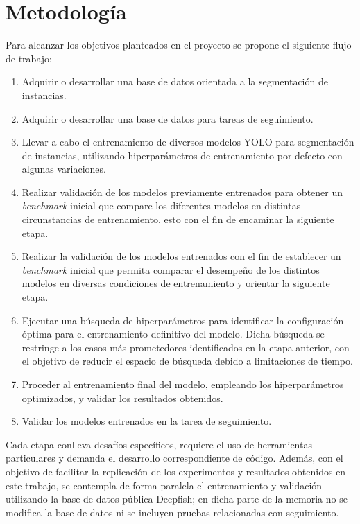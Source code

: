 \section{Metodología}
Para alcanzar los objetivos planteados en el proyecto se propone el siguiente flujo de trabajo:

\begin{enumerate}
    \item Adquirir o desarrollar una base de datos orientada a la segmentación de instancias.
    \item Adquirir o desarrollar una base de datos para tareas de seguimiento.
    \item Llevar a cabo el entrenamiento de diversos modelos YOLO para segmentación de instancias, utilizando hiperparámetros de entrenamiento por defecto con algunas variaciones.
    \item Realizar validación de los modelos previamente entrenados para obtener un \textit{benchmark} inicial que compare los diferentes modelos en distintas circunstancias de entrenamiento, esto con el fin de encaminar la siguiente etapa.
    \item Realizar la validación de los modelos entrenados con el fin de establecer un \textit{benchmark} inicial que permita comparar el desempeño de los distintos modelos en diversas condiciones de entrenamiento y orientar la siguiente etapa.
    \item Ejecutar una búsqueda de hiperparámetros para identificar la configuración óptima para el entrenamiento definitivo del modelo. Dicha búsqueda se restringe a los casos más prometedores identificados en la etapa anterior, con el objetivo de reducir el espacio de búsqueda debido a limitaciones de tiempo.
    \item Proceder al entrenamiento final del modelo, empleando los hiperparámetros optimizados, y validar los resultados obtenidos.
    \item Validar los modelos entrenados en la tarea de seguimiento.
\end{enumerate}

Cada etapa conlleva desafíos específicos, requiere el uso de herramientas particulares y demanda el desarrollo correspondiente de código. Además, con el objetivo de facilitar la replicación de los experimentos y resultados obtenidos en este trabajo, se contempla de forma paralela el entrenamiento y validación utilizando la base de datos pública Deepfish; en dicha parte de la memoria no se modifica la base de datos ni se incluyen pruebas relacionadas con seguimiento.

